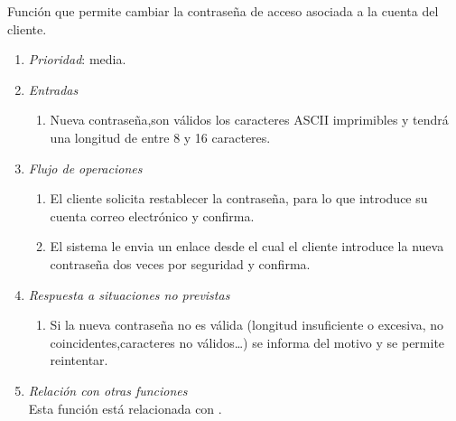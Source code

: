 

	Función que permite cambiar la contraseña de acceso asociada a la cuenta del cliente.
		
	\begin{enumerate}
		\item \textit{Prioridad}: media.
		\item \textit{Entradas}
		\begin{enumerate}
			\item Nueva contraseña,son válidos los caracteres ASCII imprimibles y tendrá una longitud de entre 8 y 16 caracteres.
		\end{enumerate}
		\item \textit{Flujo de operaciones}
		\begin{enumerate}
			\item El cliente solicita restablecer la contraseña, para lo que introduce su cuenta correo electrónico y confirma.
			\item El sistema le envia un enlace desde el cual el cliente introduce la nueva contraseña dos veces por seguridad y confirma.
		\end{enumerate}
		\item \textit{Respuesta a situaciones no previstas}
		\begin{enumerate}
			\item Si la nueva contraseña no es válida (longitud insuficiente o excesiva, no coincidentes,\break caracteres no válidos\ldots) se informa del motivo y se permite reintentar.
		\end{enumerate}
		\item \textit{Relación con otras funciones}\\
			Esta función está relacionada con .
\end{enumerate}
